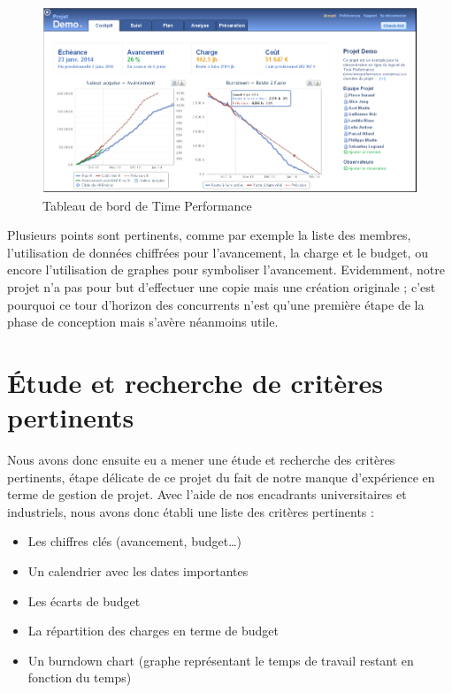 \documentclass[12pt]{report}
\begin{document}
\begin{figure}[H]
	\centering
	\includegraphics[width=1\textwidth]{pictures/clement/c2.png}
	\caption{Tableau de bord de Time Performance}
	\label{c2}
\end{figure}

Plusieurs points sont pertinents, comme par exemple la liste des membres, l’utilisation de données chiffrées pour l’avancement, la charge et le budget, ou encore l’utilisation de graphes pour symboliser l’avancement. Evidemment, notre projet n’a pas pour but d’effectuer une copie mais une création originale ; c’est pourquoi ce tour d’horizon des concurrents n’est qu’une première étape de la phase de conception mais s’avère néanmoins utile.\\
	
	\section{Étude et recherche de critères pertinents}
	
Nous avons donc ensuite eu a mener une étude et recherche des critères pertinents, étape délicate de ce projet du fait de notre manque d’expérience en terme de gestion de projet. Avec l’aide de nos encadrants universitaires et industriels, nous avons donc établi une liste des critères pertinents :\\

\begin{itemize}
\item Les chiffres clés (avancement, budget…)
\item Un calendrier avec les dates importantes
\item Les écarts de budget
\item La répartition des charges en terme de budget
\item Un burndown chart (graphe représentant le temps de travail restant en fonction du temps)\\
\end{itemize}
\end{document}
